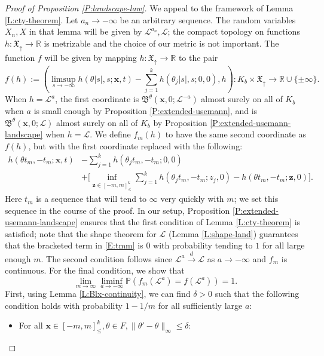 \documentclass[11pt]{article}
\newcommand{\R}{\mathbb{R}}
\newcommand{\de}{\delta}
\newcommand{\cL}{\mathcal{L}}
\newcommand{\cvgd}{\stackrel{d}{\to}}
\newcommand{\bx}{\mathbf{x}}
\newcommand{\bz}{\mathbf{z}}
\renewcommand{\P}{\mathbb{P}}
\theoremstyle{definition} %
\theoremstyle{remark} %
\begin{document}
\begin{proof}[Proof of Proposition \ref{P:landscape-law}]
We appeal to the framework of Lemma \ref{L:cty-theorem}. Let $a_n \to -\infty$ be an arbitrary sequence. The random variables $X_n, X$ in that lemma will be given by $\cL^{a_n}, \cL$; the compact topology on functions $h:\mathfrak X_\uparrow \to \R$ is metrizable and the choice of our metric is not important. The function $f$ will be given by mapping $h:\mathfrak X_\uparrow \to \R$ to the pair
$$
f(h) := (\limsup_{s \to -\infty}  h( \theta|s|, s ; \bx, t) - \sum_{j=1}^{k} h(\theta_j|s|, s; 0, 0), h):K_b \times \mathfrak X_\uparrow \to \R \cup \{\pm \infty\}.
$$
When $h = \cL^a$, the first coordinate is $\mathfrak B^\theta (\bx, 0; \cL^{-a})$ almost surely on all of $K_b$ when $a$ is small enough by Proposition \ref{P:extended-usemann}, 
and is $\mathfrak B^\theta(\bx, 0; \cL)$ almost surely on all of $K_b$ by Proposition \ref{P:extended-usemann-landscape} when $h = \cL$. We define $f_m(h)$
to have the same second coordinate as $f(h)$, but with the first coordinate replaced with the following:
\begin{equation}
	\label{E:tmm}
	\begin{split}	
	h( \theta t_m, -t_m ; \bx, t) &- \sum_{j=1}^k h(\theta_j t_m, -t_m; 0, 0) \\
	&+ \Big[\inf_{\bz \in [-m, m]^k_\le} \sum_{j=1}^k h(\theta_j t_m, -t_m; z_j, 0) - h(\theta t_m, -t_m; \bz, 0)\Big].
	\end{split}
\end{equation}
Here $t_m$ is a sequence that will tend to $\infty$ very quickly with $m$; we set this sequence in the course of the proof. In our setup, Proposition \ref{P:extended-usemann-landscape} ensures that the first condition of Lemma \ref{L:cty-theorem} is satisfied; note that the shape theorem for $\cL$ (Lemma \ref{L:shape-land}) guarantees that the bracketed term in \eqref{E:tmm} is $0$ with probability tending to $1$ for all large enough $m$. The second condition follows since $\cL^{a} \cvgd \cL$ as $a \to -\infty$ and $f_m$ is continuous. For the final condition, we show that
\begin{equation}
\label{E:lim-mm}
\lim_{m \to \infty} \liminf_{a \to -\infty} \P(f_m(\cL^a) = f(\cL^a)) = 1.
\end{equation}
First, using Lemma \ref{L:Blx-continuity}, we can find $\de > 0$ such that the following condition holds with probability $1 - 1/m$ for all sufficiently large $a$:
\begin{itemize}
	\item For all $\bx \in [-m, m]^k_\le, \theta \in F, \|\theta' - \theta\|_\infty \le \de$:

\end{itemize}
\end{proof}
\end{document}
